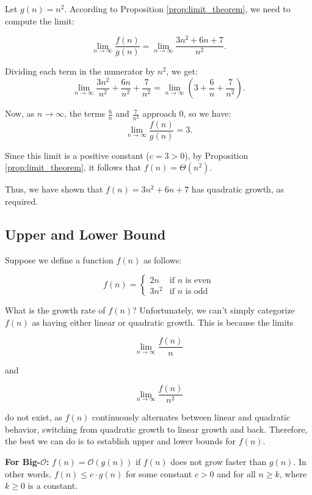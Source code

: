\begin{solution}Let $g(n) = n^2$. According to Proposition \ref{prop:limit_theorem}, we need to compute the limit:
    
    \[
    \lim_{n \to \infty} \frac{f(n)}{g(n)} = \lim_{n \to \infty} \frac{3n^2 + 6n + 7}{n^2}.
    \]
    
    Dividing each term in the numerator by $n^2$, we get:
    \[
    \lim_{n \to \infty} \frac{3n^2}{n^2} + \frac{6n}{n^2} + \frac{7}{n^2} = \lim_{n \to \infty} \left( 3 + \frac{6}{n} + \frac{7}{n^2} \right).
    \]
    
    Now, as $n \to \infty$, the terms $\frac{6}{n}$ and $\frac{7}{n^2}$ approach $0$, so we have:
    \[
    \lim_{n \to \infty} \frac{f(n)}{g(n)} = 3.
    \]
    
    Since this limit is a positive constant ($c = 3 > 0$), by Proposition \ref{prop:limit_theorem}, it follows that $f(n) = \Theta(n^2)$.
    
    Thus, we have shown that $f(n) = 3n^2 + 6n + 7$ has quadratic growth, as required.
    \end{solution}
    

\subsection*{Upper and Lower Bound}

Suppose we define a function \( f(n) \) as follows:

\[
f(n) = 
\begin{cases} 
2n & \text{if } n \text{ is even} \\ 
3n^2 & \text{if } n \text{ is odd} 
\end{cases}
\]

What is the growth rate of \( f(n) \)? Unfortunately, we can't simply categorize \( f(n) \) as having either linear or quadratic growth. This is because the limits

\[
\lim_{n \rightarrow \infty} \frac{f(n)}{n}
\]

and

\[
\lim_{n \rightarrow \infty} \frac{f(n)}{n^2}
\]

do not exist, as \( f(n) \) continuously alternates between linear and quadratic behavior, switching from quadratic growth to linear growth and back. Therefore, the best we can do is to establish upper and lower bounds for \( f(n) \).

\textbf{For Big-$\mathcal{O}$: }\( f(n) = \mathcal{O}(g(n)) \) if \( f(n) \) does not grow faster than \( g(n) \). In other words, \( f(n) \leq c \cdot g(n) \) for some constant \( c > 0 \) and for all \( n \geq k \), where \( k \geq 0 \) is a constant.

